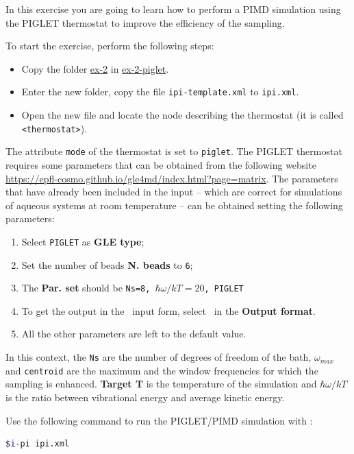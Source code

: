 \documentclass{article}
\begin{document}
\vspace{2em}

\begin{Exercise}[label={inputs},title={Liquid water with the
    \emph{PIGLET} thermostat}]
In this exercise you are going to learn how to perform a PIMD
simulation using the PIGLET thermostat to improve the efficiency of
the sampling.

\Question
To start the exercise, perform the following steps:
\begin{itemize}
\item Copy the folder \url{ex-2} in \url{ex-2-piglet}.
\item  Enter the new folder, copy the file \texttt{ipi-template.xml}
  to \texttt{ipi.xml}. 
\item Open the new file and locate the node describing the
  thermostat (it is called \texttt{<thermostat>}).
\end{itemize}
The attribute \texttt{mode} of the
thermostat is set to \texttt{piglet}. The PIGLET thermostat requires
some parameters that can be obtained from the following website
\url{https://epfl-cosmo.github.io/gle4md/index.html?page=matrix}.
The parameters that have already been included in the input -- which
are correct for simulations of aqueous systems at room temperature --
can be obtained setting the following parameters:
\begin{enumerate}
\item Select \texttt{PIGLET} as \textbf{GLE type};
\item Set the number of beads \textbf{N. beads} to \texttt{6};
\item The \textbf{Par. set} should be \texttt{Ns=8,
    $\hbar\omega/kT=20$, PIGLET}
\item To get the output in the \ipi\ input form, select \ipi\ in the
  \textbf{Output format}.
\item All the other parameters are left to the default value.
\end{enumerate}
In this context, the \texttt{Ns} are the number of degrees of freedom
of the bath, $\omega_{max}$ and \texttt{centroid} are the maximum
and the window frequencies for which the sampling is
enhanced. \textbf{Target T} is the temperature of the simulation and
$\hbar\omega/kT$ is the ratio between vibrational energy and average
kinetic energy.

\Question 
Use the following command to run the PIGLET/PIMD simulation with
\ipi:
\begin{lstlisting}[language=bash]
$i-pi ipi.xml
\end{lstlisting}%


\end{Exercise}
\end{document}
